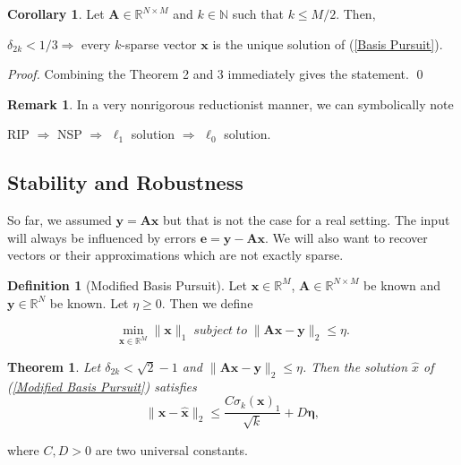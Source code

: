 \documentclass[11pt,american]{book} %
\theoremstyle{plain}
\newtheorem{thm}{Theorem}
\theoremstyle{definition}
\newtheorem{defn}{Definition}
\newtheorem{rmrk}{Remark}
\newtheorem{coro}{Corollary}
\begin{document}
\begin{coro}
	Let $\bm{A} \in \mathbb{R}^{N \times M}$ and $k \in \mathbb{N}$ such that $k \leqslant M/2$. Then,
	\begin{center}
		$\delta_{2k} < 1/3 \Rightarrow$  every $k$-sparse vector $\bm{x}$ is the unique solution of (\ref{Basis Pursuit}).
	\end{center}
\end{coro}
\emph{Proof.} Combining the Theorem 2 and 3 immediately gives the statement.
\qed

\begin{rmrk}
	In a very nonrigorous reductionist manner, we can symbolically note
	\begin{center}
		RIP $\Rightarrow$ NSP $\Rightarrow$ $\ell_{1}$ solution $\Rightarrow$ $\ell_{0}$ solution.
	\end{center}
\end{rmrk}

\subsection*{Stability and Robustness}
So far, we assumed $\bm{y} = \bm{Ax}$ but that is not the case for a real setting. The input will always be influenced by errors $\bm{e} = \bm{y} - \bm{Ax}$. We will also want to recover vectors or their approximations which are not exactly sparse. %

\begin{defn}[Modified Basis Pursuit]
	Let $\bm{x} \in \mathbb{R}^{M}$, $\bm{A} \in \mathbb{R}^{N \times M}$ be known and $\bm{y} \in \mathbb{R}^{N}$ be known. Let $\eta \geqslant 0$. Then we define
	
	\begin{equation}
		\min_{\bm{{x}} \in \mathbb{R}^{M}}\lVert \bm{x}\rVert_{1} \; subject \; to\;  \lVert \bm{A} \bm{x} - \bm{y} \rVert_2 \leqslant \eta. \label{Modified Basis Pursuit}
	\end{equation}
\end{defn}

\begin{thm}
	Let $\delta_{2k} < \sqrt 2  -1$ and $\lVert \bm{Ax}-\bm{y}\rVert_2 \leqslant \eta$. Then the solution $\hat{x}$ of (\ref{Modified Basis Pursuit}) satisfies
	\begin{equation}
		\lVert\bm{x} - \bm{\hat{x}}\rVert_2 \leqslant \frac{C \sigma_k(\bm{x})_1}{\sqrt k} + D \bm{\eta}, \label{approximation of solution}
	\end{equation}
\end{thm}
where $C,D > 0$ are two universal constants.
\end{document}
